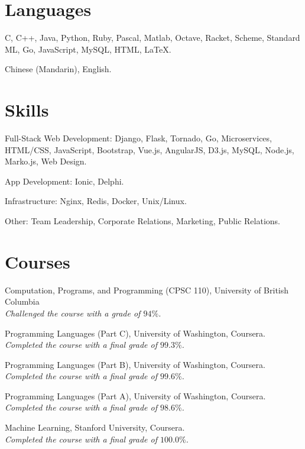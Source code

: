 \documentclass[letterpaper]{article}
\renewenvironment{itemize}{
  \begin{list}{}{
    \setlength{\leftmargin}{1.5em}
  }
}{
  \end{list}
}
\begin{document}
\section*{Languages}

\begin{itemize}
  \item C, C++, Java, Python, Ruby, Pascal, Matlab, Octave, Racket, Scheme, Standard ML, Go, JavaScript, MySQL, HTML, \LaTeX.
  \item Chinese (Mandarin), English.
\end{itemize}


\section*{Skills}

\begin{itemize}
  \item Full-Stack Web Development: Django, Flask, Tornado, Go, Microservices, HTML/CSS, JavaScript, Bootstrap, Vue.js, AngularJS, D3.js, MySQL, Node.js, Marko.js, Web Design.

  \item App Development: Ionic, Delphi.

  \item Infrastructure: Nginx, Redis, Docker, Unix/Linux.

  \item Other: Team Leadership, Corporate Relations, Marketing, Public Relations.
\end{itemize}

\section*{Courses}

\begin{itemize}
  \item Computation, Programs, and Programming (CPSC 110), University of British Columbia\\
  \emph{Challenged the course with a grade of $94\%$.}

  \item Programming Languages (Part C), University of Washington, Coursera.\\
  \emph{Completed the course with a final grade of $99.3\%$.}

  \item Programming Languages (Part B), University of Washington, Coursera.\\
  \emph{Completed the course with a final grade of $99.6\%$.}

  \item Programming Languages (Part A), University of Washington, Coursera.\\
  \emph{Completed the course with a final grade of $98.6\%$.}

  \item Machine Learning, Stanford University, Coursera.\\
  \emph{Completed the course with a final grade of $100.0\%$.}
\end{itemize}


\bigskip

\end{document}
